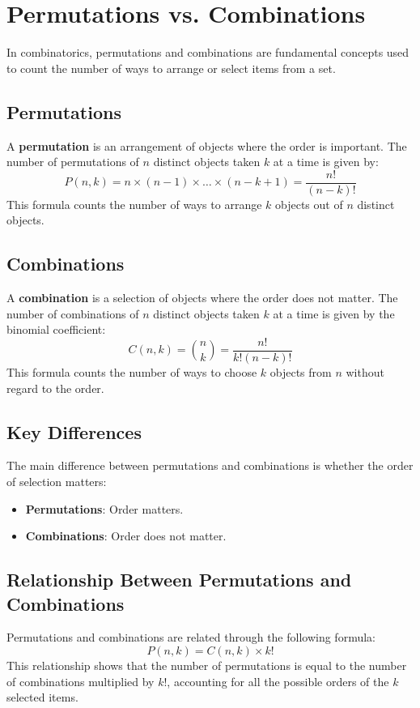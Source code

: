 \documentclass[10pt]{article}
\theoremstyle{plain}
\theoremstyle{definition}
\theoremstyle{remark}
\begin{document}
\section{Permutations vs. Combinations}

In combinatorics, permutations and combinations are fundamental concepts used to count the number of ways to arrange or select items from a set.

\subsection{Permutations}

A \textbf{permutation} is an arrangement of objects where the order is important. The number of permutations of \( n \) distinct objects taken \( k \) at a time is given by:
\[
P(n, k) = n \times (n - 1) \times \dots \times (n - k + 1) = \frac{n!}{(n - k)!}
\]
This formula counts the number of ways to arrange \( k \) objects out of \( n \) distinct objects.

\subsection{Combinations}

A \textbf{combination} is a selection of objects where the order does not matter. The number of combinations of \( n \) distinct objects taken \( k \) at a time is given by the binomial coefficient:
\[
C(n, k) = \binom{n}{k} = \frac{n!}{k!(n - k)!}
\]
This formula counts the number of ways to choose \( k \) objects from \( n \) without regard to the order.

\subsection{Key Differences}

The main difference between permutations and combinations is whether the order of selection matters:
\begin{itemize}
    \item \textbf{Permutations}: Order matters.
    \item \textbf{Combinations}: Order does not matter.
\end{itemize}

\subsection{Relationship Between Permutations and Combinations}

Permutations and combinations are related through the following formula:
\[
P(n, k) = C(n, k) \times k!
\]
This relationship shows that the number of permutations is equal to the number of combinations multiplied by \( k! \), accounting for all the possible orders of the \( k \) selected items.
\end{document}
